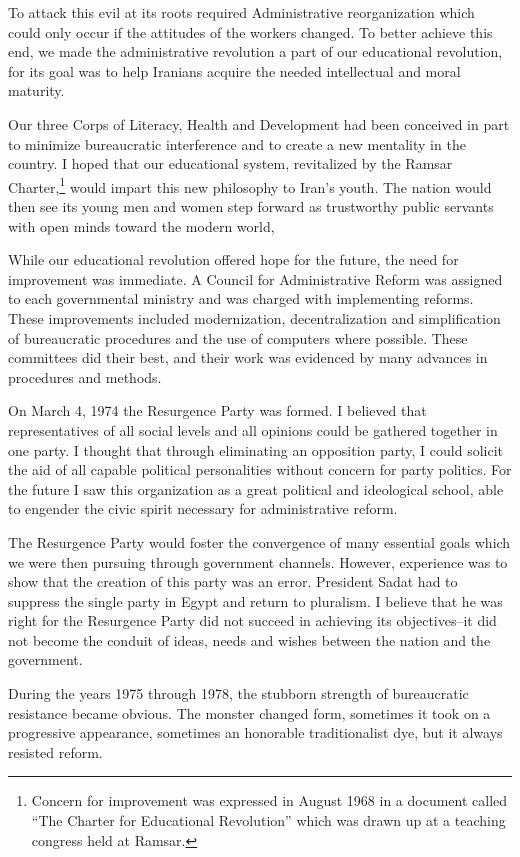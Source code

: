 To attack this evil at its roots required Administrative reorganization which could only occur if the attitudes of the workers changed. To better achieve this end, we made the administrative revolution a part of our educational revolution, for its goal was to help Iranians acquire the needed intellectual and moral maturity. 


Our three Corps of Literacy, Health and Development had been conceived in part to minimize bureaucratic interference and to create a new mentality in the country. I hoped that our educational system, revitalized by the Ramsar Charter,\footnote{Concern for improvement was expressed in August 1968 in a document called “The Charter for Educational Revolution” which was drawn up at a teaching congress held at Ramsar.} would impart this new philosophy to Iran's youth. The nation would then see its young men and women step forward as trustworthy public servants with open minds toward the modern world, 

While our educational revolution offered hope for the future, the need for improvement was immediate. A Council for Administrative Reform was assigned to each governmental ministry and was charged with implementing reforms. These improvements included modernization, decentralization and simplification of bureaucratic procedures and the use of computers where possible. These committees did their best, and their work was evidenced by many advances in procedures and methods. 

On March 4, 1974 the Resurgence Party was formed. I believed that representatives of all social levels and all opinions could be gathered together in one party. I thought that through eliminating an opposition party, I could solicit the aid of all capable political personalities without concern for party politics. For the future I saw this organization as a great political and ideological school, able to engender the civic spirit necessary for administrative reform. 

The Resurgence Party would foster the convergence of many essential goals which we were then pursuing through government channels. However, experience was to show that the creation of this party was an error. President Sadat had to suppress the single party in Egypt and return to pluralism. I believe that he was right for the Resurgence Party did not succeed in achieving its objectives--it did not become the conduit of ideas, needs and wishes between the nation and the government. 

During the years 1975 through 1978, the stubborn strength of bureaucratic resistance became obvious. The monster changed form, sometimes it took on a progressive appearance, sometimes an honorable traditionalist dye, but it always resisted reform. 

